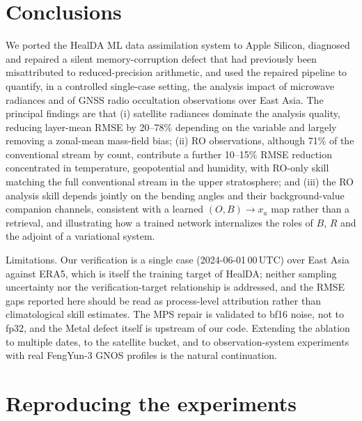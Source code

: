 \documentclass[twocolumn,11pt]{article}
\begin{document}
\section{Conclusions}\label{sec:conclusions}

We ported the HealDA ML data assimilation system to Apple Silicon,
diagnosed and repaired a silent memory-corruption defect that had
previously been misattributed to reduced-precision arithmetic, and
used the repaired pipeline to quantify, in a controlled single-case
setting, the analysis impact of microwave radiances and of GNSS
radio occultation observations over East Asia. The principal
findings are that (i) satellite radiances dominate the analysis
quality, reducing layer-mean RMSE by 20--78\% depending on the
variable and largely removing a zonal-mean mass-field bias; (ii) RO
observations, although 71\% of the conventional stream by count,
contribute a further 10--15\% RMSE reduction concentrated in
temperature, geopotential and humidity, with RO-only skill matching
the full conventional stream in the upper stratosphere; and (iii)
the RO analysis skill depends jointly on the bending angles and
their background-value companion channels, consistent with a learned
$(O,B)\!\rightarrow\!x_a$ map rather than a retrieval, and
illustrating how a trained network internalizes the roles of $B$,
$R$ and the adjoint of a variational system.

Limitations. Our verification is a single case (2024-06-01\,00\,UTC)
over East Asia against ERA5, which is itself the training target of
HealDA; neither sampling uncertainty nor the verification-target
relationship is addressed, and the RMSE gaps reported here should be
read as process-level attribution rather than climatological skill
estimates. The MPS repair is validated to bf16 noise, not to fp32,
and the Metal defect itself is upstream of our code. Extending the
ablation to multiple dates, to the satellite bucket, and to
observation-system experiments with real FengYun-3 GNOS profiles is
the natural continuation.

\appendix

\section{Reproducing the experiments}\label{app:repro}
\end{document}
